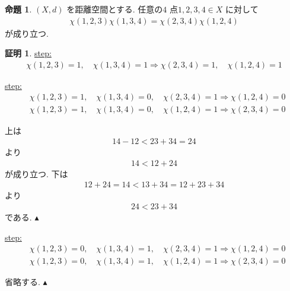 \documentclass[10pt, fleqn, label-section=none]{bxjsarticle}
\theoremstyle{definition}
\newtheorem{prop}[dfn]{命題}
\newtheorem*{pf*}{証明}
\newcommand{\naraba}{\Rightarrow}
\renewcommand{\;}{\, ; \,}
\newenvironment{claim}[1]{\par\noindent\underline{step:}\space#1}{}
\newenvironment{claimproof}[1]{\par\noindent{($\because$)}\space#1}{\hfill $\blacktriangle $}
\begin{document}
\begin{prop}
$(X, d)$ を距離空間とする. 任意の$4$ 点$1,2,3,4 \in X$ に対して
\begin{align*} \chi (1, 2, 3) \chi(1, 3, 4) = \chi(2, 3, 4) \chi(1, 2, 4)  \end{align*}
が成り立つ. 
\end{prop}
\begin{pf*}
\begin{claim}
\begin{align*} \chi (1, 2, 3) = 1, \quad \chi(1, 3, 4) = 1  \naraba  \chi(2, 3, 4) = 1, \quad \chi(1, 2, 4) = 1 \end{align*} 
\end{claim}

\begin{claim}
\begin{align*} & \chi (1, 2, 3) = 1, \quad \chi(1, 3, 4) = 0  ,\quad   \chi(2, 3, 4) = 1  \naraba \chi(1, 2, 4) = 0 \\&  \chi (1, 2, 3) = 1, \quad \chi(1, 3, 4) = 0  ,\quad   \chi(1, 2, 4) = 1 \naraba \chi(2, 3, 4) = 0  \end{align*} 
\end{claim}
\begin{claimproof} 上は
\begin{align*} 14 -12 < 23 + 34  = 24\end{align*} 
より
\begin{align*} 14 < 12 + 24\end{align*}
が成り立つ.  下は
\begin{align*} 12 + 24 = 14 < 13 + 34 = 12 + 23 + 34 \end{align*}
より
\begin{align*} 24 < 23 + 34\end{align*}
である. 
\end{claimproof}

\begin{claim}
\begin{align*} & \chi (1, 2, 3) = 0, \quad \chi(1, 3, 4) = 1  ,\quad   \chi(2, 3, 4) = 1  \naraba \chi(1, 2, 4) = 0 \\&  \chi (1, 2, 3) = 0, \quad \chi(1, 3, 4) = 1  ,\quad   \chi(1, 2, 4) = 1 \naraba \chi(2, 3, 4) = 0  \end{align*} 
\end{claim}
\begin{claimproof}
省略する. 
\end{claimproof}


\end{pf*}
\end{document}
